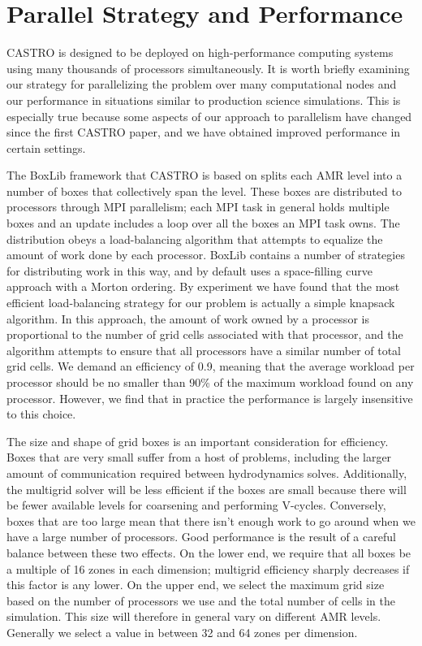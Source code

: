 \documentclass[iop]{../emulateapj}
\begin{document}
\section{Parallel Strategy and Performance}\label{sec:Performance}

CASTRO is designed to be deployed on high-performance computing systems using 
many thousands of processors simultaneously. It is worth briefly examining 
our strategy for parallelizing the problem over many computational nodes 
and our performance in situations similar to production science simulations. 
This is especially true because some aspects of our approach to parallelism 
have changed since the first CASTRO paper, and we have obtained improved 
performance in certain settings.

The BoxLib framework that CASTRO is based on splits each AMR level into a number 
of boxes that collectively span the level. These boxes are distributed to processors 
through MPI parallelism; each MPI task in general holds multiple boxes and 
an update includes a loop over all the boxes an MPI task owns. The distribution 
obeys a load-balancing algorithm that attempts to equalize the amount of work 
done by each processor. BoxLib contains a number of strategies for distributing 
work in this way, and by default uses a space-filling curve approach with a 
Morton ordering. By experiment we have found that the most efficient load-balancing 
strategy for our problem is actually a simple knapsack algorithm. In this approach, 
the amount of work owned by a processor is proportional to the number of grid cells 
associated with that processor, and the algorithm attempts to ensure that all 
processors have a similar number of total grid cells. We demand an efficiency of 0.9,
meaning that the average workload per processor should be no smaller than 90\% of the 
maximum workload found on any processor. However, we find that in practice the 
performance is largely insensitive to this choice.

The size and shape of grid boxes is an important consideration for efficiency. 
Boxes that are very small suffer from a host of problems, including the larger 
amount of communication required between hydrodynamics solves. Additionally, 
the multigrid solver will be less efficient if the boxes are small because there 
will be fewer available levels for coarsening and performing V-cycles. Conversely, 
boxes that are too large mean that there isn't enough work to go around when we 
have a large number of processors. Good performance is the result of a careful 
balance between these two effects. On the lower end, we require that all boxes 
be a multiple of 16 zones in each dimension; multigrid efficiency sharply decreases 
if this factor is any lower. On the upper end, we select the maximum grid size 
based on the number of processors we use and the total number of cells in the 
simulation. This size will therefore in general vary on different AMR levels. 
Generally we select a value in between 32 and 64 zones per dimension.
\end{document}
